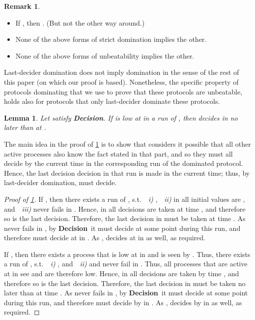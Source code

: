 \documentclass[11pt]{article}
\newtheorem{lemma}{Lemma}
\theoremstyle{definition}
\newtheorem{remark}{Remark}
\newcommand{\Decision}{{\bf Decision}}
\begin{document}
\begin{remark}
\leavevmode
\begin{itemize}
\item
If , then . (But not the other way around.)
\item
None of the above forms of strict domination implies the other.
\item
None of the above forms of unbeatability implies the other.
\end{itemize}
\end{remark}

Last-decider domination does not imply domination in the sense of the rest of this paper (on which our proof is based).
Nonetheless, the specific property of protocols dominating  that we use to prove that these protocols are unbeatable, holds also for protocols that only last-decider dominate these protocols.

\begin{lemma}\label{last-dom-sufficient}
Let  satisfy \Decision. If  is low at  in a run  of , then  decides in  no later than at .
\end{lemma}

The main idea in the proof of \cref{last-dom-sufficient} is to show that  considers it possible that
all other active processes also know the fact stated in that part,
and so they must all decide by the current time in the corresponding run of the dominated protocol. Hence, the last decision decision in that run is made in the current time; thus, by last-decider domination,  must decide.

\begin{proof}[Proof of \cref{last-dom-sufficient}]
If , then there exists a run  of , s.t.~~\emph{i)} ,~~\emph{ii)} in  all initial values are , and~~\emph{iii)}  never fails in . Hence, in  all decisions
are taken at time , and therefore so is the last decision. Therefore, the last decision in  must be taken at time . As  never fails in , by \Decision\ it must decide at some
point during this run, and therefore must decide at  in . As ,  decides at  in  as well, as required.

If , then there exists a process  that is low at  in  and  is seen by . Thus, there exists a run  of ,
s.t.~~\emph{i)} , and~~\emph{ii)}  and  never fail in . Thus, all processes that are active at  in  see  and are therefore low.
Hence, in  all decisions are taken by time , and therefore so is the last decision. Therefore, the last decision in  must be taken no later than at time .
As  never fails in , by \Decision\ it must decide at some point during this run, and therefore must decide by  in . As ,  decides by  in  as well, as required.
\end{proof}
\end{document}
